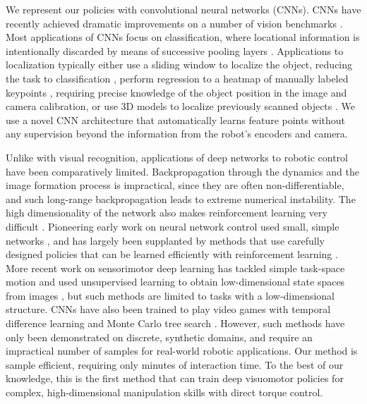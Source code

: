 \documentclass[conference]{IEEEtran}
\begin{document}
We represent our policies with convolutional neural networks (CNNs). CNNs have recently achieved dramatic improvements on a number of vision benchmarks \cite{gddm-fhaod-13,ksh-incdc-12,tjlb-jcngm-14}. Most applications of CNNs focus on classification, where locational information is intentionally discarded by means of successive pooling layers \cite{lgrn-cdbn-09}. Applications to localization typically either use a sliding window to localize the object, reducing the task to classification \cite{gddm-fhaod-13}, perform regression to a heatmap of manually labeled keypoints \cite{tjlb-jcngm-14}, requiring precise knowledge of the object position in the image and camera calibration, or use 3D models to localize previously scanned objects \cite{psgs-3ddpm-12,sl-3dgoc-07}. We use a novel CNN architecture that automatically learns feature points without any supervision beyond the information from the robot's encoders and camera.

Unlike with visual recognition, applications of deep networks to robotic control have been comparatively limited. Backpropagation through the dynamics and the image formation process is impractical, since they are often non-differentiable, and such long-range backpropagation leads to extreme numerical instability. The high dimensionality of the network also makes reinforcement learning very difficult \cite{dnp-spsr-13}. Pioneering early work on neural network control used small, simple networks \cite{hszg-nncss-92,p-alvin-89}, and has largely been supplanted by methods that use carefully designed policies that can be learned efficiently with reinforcement learning \cite{kbp-rlrs-13}. More recent work on sensorimotor deep learning has tackled simple task-space motion \cite{lr-avsrg-13} and used unsupervised learning to obtain low-dimensional state spaces from images \cite{rlv-arlrv-12}, but such methods are limited to tasks with a low-dimensional structure. CNNs have also been trained to play video games with temporal difference learning and Monte Carlo tree search \cite{gsllw-amcts-14,mksga-padrl-13}. However, such methods have only been demonstrated on discrete, synthetic domains, and require an impractical number of samples for real-world robotic applications. Our method is sample efficient, requiring only minutes of interaction time. To the best of our knowledge, this is the first method that can train deep visuomotor policies for complex, high-dimensional manipulation skills with direct torque control.
\end{document}
